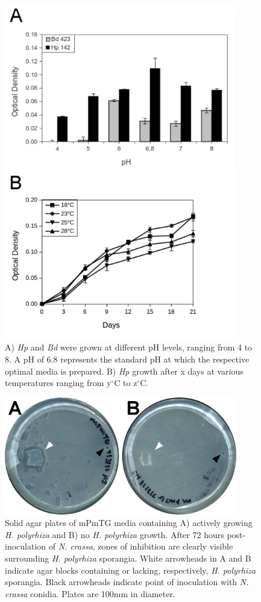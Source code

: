 \begin{figure}[hb]
  \centering
  \includegraphics[width=4in]{./Chapter_Inhibition/img/HpBd_pHTempAssay.png}
  \caption[\textit{H. polyrhiza} is more tolerant of environmental stresses than \textit{B. dendrobatidis}.]{A) \textit{Hp} and \textit{Bd} were grown at different pH levels, ranging from 4 to 8. A pH of 6.8 represents the standard pH at which the respective optimal media is prepared. B) \textit{Hp} growth after x days at various temperatures ranging from y$^{\circ}$C to z$^{\circ}$C.}
  \label{fig:ChInhib_HpBdpHTemp}
\end{figure}

\begin{figure}[hb]
  \centering
  \includegraphics[width=4in]{./Chapter_Inhibition/img/HpNc_avoidance.png}
  \caption[\textit{N. crassa} displays no avoidance behavior of solid agar blocks.]{Solid agar plates of mPmTG media containing A) actively growing \textit{H. polyrhiza} and B) no \textit{H. polyrhiza} growth. After 72 hours post-inoculation of \textit{N. crassa}, zones of inhibition are clearly visible surrounding \textit{H. polyrhiza} sporangia. White arrowheads in A and B indicate agar blocks containing or lacking, respectively, \textit{H. polyrhiza} sporangia. Black arrowheads indicate point of inoculation with \textit{N. crassa} conidia. Plates are 100mm in diameter.}
  \label{fig:ChInhib_NcAvoidance}
\end{figure}

